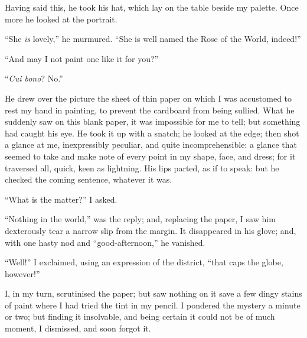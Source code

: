 Having said this, he took his hat, which lay on the table beside my
palette. Once more he looked at the portrait.

\enquote{She \emph{is} lovely,} he murmured. \enquote{She is well named the
Rose of the World, indeed!}

\enquote{And may I not paint one like it for you?}

\enquote{\emph{Cui bono}? No.}

He drew over the picture the sheet of thin paper on which I was
accustomed to rest my hand in painting, to prevent the cardboard from
being sullied. What he suddenly saw on this blank paper, it was
impossible for me to tell; but something had caught his eye. He took it
up with a snatch; he looked at the edge; then shot a glance at me,
inexpressibly peculiar, and quite incomprehensible: a glance that seemed
to take and make note of every point in my shape, face, and dress; for
it traversed all, quick, keen as lightning. His lips parted, as if to
speak: but he checked the coming sentence, whatever it was.

\enquote{What is the matter?} I asked.

\enquote{Nothing in the world,} was the reply; and, replacing the paper,
I saw him dexterously tear a narrow slip from the margin. It
disappeared in his glove; and, with one hasty nod and
\enquote{good-afternoon,} he vanished.

\enquote{Well!} I exclaimed, using an expression of the district,
\enquote{that caps the globe, however!}

I, in my turn, scrutinised the paper; but saw nothing on it save a few
dingy stains of paint where I had tried the tint in my pencil. I
pondered the mystery a minute or two; but finding it insolvable, and
being certain it could not be of much moment, I dismissed, and soon
forgot it.
